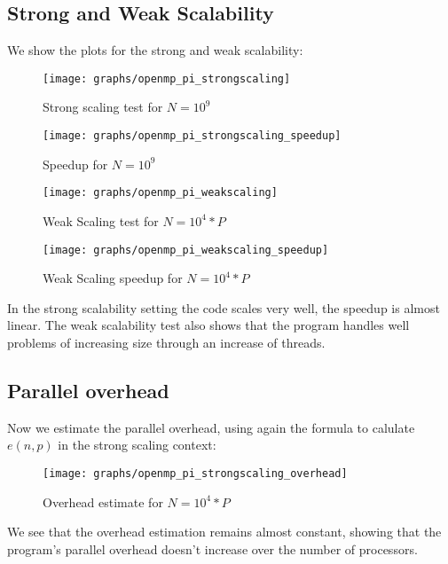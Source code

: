 \documentclass{article}
\begin{document}
\subsection{Strong and Weak Scalability}
We show the plots for the strong and weak scalability:


\begin{figure}[H] %
	\centering
	\texttt{[image: graphs/openmp\_pi\_strongscaling]} %
	\caption{Strong scaling test for $N=10^9$}
\end{figure}

\begin{figure}[H] %
	\centering
	\texttt{[image: graphs/openmp\_pi\_strongscaling\_speedup]} %
	\caption{Speedup for $N=10^9$}
\end{figure}

\begin{figure}[H] %
	\centering
	\texttt{[image: graphs/openmp\_pi\_weakscaling]} %
	\caption{Weak Scaling test for $N=10^4*P$}
\end{figure}

\begin{figure}[H] %
	\centering
	\texttt{[image: graphs/openmp\_pi\_weakscaling\_speedup]} %
	\caption{Weak Scaling speedup for $N=10^4*P$}
\end{figure}
In the strong scalability setting the code scales very well, the speedup is almost linear. The weak scalability test also shows that the program handles well problems of increasing size through an increase of threads.
\subsection{Parallel overhead}

Now we estimate the parallel overhead, using again the formula to calulate $e(n,p)$ in the strong scaling context:


\begin{figure}[H] %
	\centering
	\texttt{[image: graphs/openmp\_pi\_strongscaling\_overhead]} %
	\caption{Overhead estimate for $N=10^4*P$}
\end{figure}
We see that the overhead estimation remains almost constant, showing that the program's parallel overhead doesn't increase over the number of processors.
\end{document}
